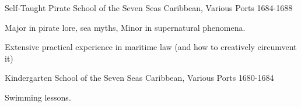 


\begin{cventries}


\newcommand*\honourstyle[1]{\fontsize{10pt}{1em}\bodyfontlight\itshape\color{text} #1}

\cventry
{Self-Taught Pirate} %
{School of the Seven Seas} %
{Caribbean, Various Ports} %
{1684-1688} %
{ %
\begin{cvitems}
    \item {Major in pirate lore, sea myths, Minor in supernatural phenomena.}
    \item {Extensive practical experience in maritime law (and how to creatively circumvent it)}
\end{cvitems}
}

\cventry
{Kindergarten} %
{School of the Seven Seas} %
{Caribbean, Various Ports} %
{1680-1684} %
{ %
\begin{cvitems}
    \item {Swimming lessons.}
\end{cvitems}
}

\end{cventries}
